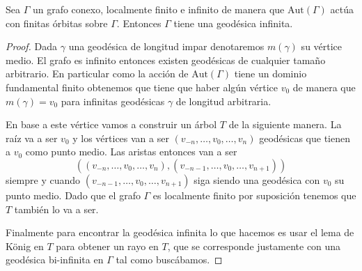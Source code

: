 \documentclass[tesis.tex]{subfiles}
\newcommand{\aut}{\text{Aut}}
\begin{document}
\begin{lema}\label{lema_geodesica_biinfinita}
	Sea $\Gamma$ un grafo conexo, localmente finito e infinito de manera que $\aut(\Gamma)$ actúa con finitas órbitas sobre $\Gamma$.
	Entonces $\Gamma$ tiene una geodésica infinita.
\end{lema}
\begin{proof}
	Dada $\gamma$ una geodésica de longitud impar denotaremos $m(\gamma)$ su vértice medio.	
	El grafo es infinito entonces existen geodésicas de cualquier tamaño arbitrario.
	En particular como la acción de $\aut(\Gamma)$ tiene un dominio fundamental finito obtenemos que tiene que haber algún vértice $v_0$ de manera que $m(\gamma) = v_0$ para infinitas geodésicas $\gamma$ de longitud arbitraria.
	
	En base a este vértice vamos a construir un árbol $T$ de la siguiente manera.
	La raíz va a ser $v_0$ y los vértices van a ser $(v_{-n},\dots, v_0,\dots,v_n)$ geodésicas que tienen a $v_0$ como punto medio.
	Las aristas entonces van a ser 
	\[
		((v_{-n},\dots, v_0,\dots,v_n), (v_{-n-1},\dots, v_0,\dots,v_{n+1}))
	\]
	siempre y cuando $(v_{-n-1},\dots, v_0,\dots,v_{n+1})$ siga siendo una geodésica con $v_0$ su punto medio.
	Dado que el grafo $\Gamma$ es localmente finito por suposición tenemos que $T$ también lo va a ser.
	
	Finalmente para encontrar la geodésica infinita lo que hacemos es usar el lema de König en $T$ para obtener un rayo en $T$, que se corresponde justamente con una geodésica bi-infinita en $\Gamma$ tal como buscábamos.
	
\end{proof}
\end{document}
